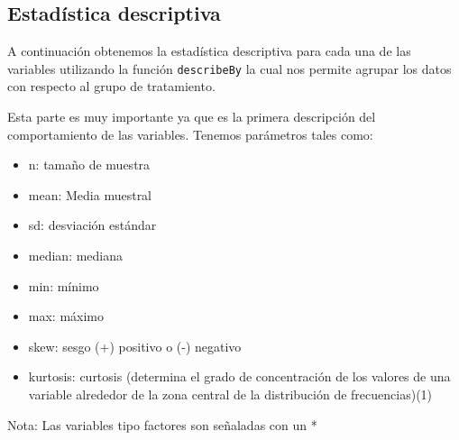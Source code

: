 \documentclass[
]{article}
\newenvironment{Shaded}{\begin{snugshade}}{\end{snugshade}}
\newcommand{\AttributeTok}[1]{\textcolor[rgb]{0.13,0.29,0.53}{#1}}
\newcommand{\CommentTok}[1]{\textcolor[rgb]{0.56,0.35,0.01}{\textit{#1}}}
\newcommand{\DecValTok}[1]{\textcolor[rgb]{0.00,0.00,0.81}{#1}}
\newcommand{\FunctionTok}[1]{\textcolor[rgb]{0.13,0.29,0.53}{\textbf{#1}}}
\newcommand{\NormalTok}[1]{#1}
\newcommand{\OtherTok}[1]{\textcolor[rgb]{0.56,0.35,0.01}{#1}}
\newcommand{\SpecialCharTok}[1]{\textcolor[rgb]{0.81,0.36,0.00}{\textbf{#1}}}
\providecommand{\tightlist}{%
  \setlength{\itemsep}{0pt}\setlength{\parskip}{0pt}}
\begin{document}
\hypertarget{estaduxedstica-descriptiva}{%
\subsection{Estadística descriptiva}\label{estaduxedstica-descriptiva}}

A continuación obtenemos la estadística descriptiva para cada una de las
variables utilizando la función \texttt{describeBy} la cual nos permite
agrupar los datos con respecto al grupo de tratamiento.

Esta parte es muy importante ya que es la primera descripción del
comportamiento de las variables. Tenemos parámetros tales como:

\begin{itemize}
\tightlist
\item
  n: tamaño de muestra
\item
  mean: Media muestral
\item
  sd: desviación estándar
\item
  median: mediana
\item
  min: mínimo
\item
  max: máximo
\item
  skew: sesgo (+) positivo o (-) negativo
\item
  kurtosis: curtosis (determina el grado de concentración de los valores
  de una variable alrededor de la zona central de la distribución de
  frecuencias)(1)
\end{itemize}

Nota: Las variables tipo factores son señaladas con un *

\begin{Shaded}
\end{Shaded}
\end{document}
